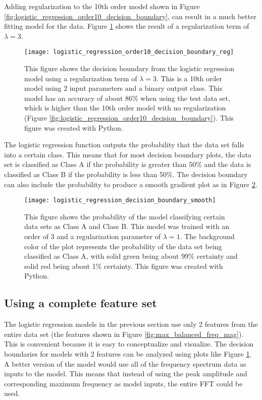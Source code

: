 Adding regularization to the 10th order model shown in Figure \ref{fig:logistic_regression_order10_decision_boundary}, can result in a much better fitting model for the data.  Figure \ref{fig:logistic_regression_order10_decision_boundary_reg} shows the result of a regularization term of $\lambda=3$.

\begin{figure}
	\centering
	\texttt{[image: logistic\_regression\_order10\_decision\_boundary\_reg]}
	\decoRule
	\caption{This figure shows the decision boundary from the logistic regression model using a regularization term of $\lambda=3$.  This is a 10th order model using 2 input parameters and a binary output class.  This model has an accuracy of about 86\% when using the test data set, which is higher than the 10th order model with no regularization (Figure \ref{fig:logistic_regression_order10_decision_boundary}).  This figure was created with Python.}
	\label{fig:logistic_regression_order10_decision_boundary_reg}
\end{figure}

The logistic regression function outputs the probability that the data set falls into a certain class.  This means that for most decision boundary plots, the data set is classified as Class A if the probability is greater than 50\% and the data is classified as Class B if the probability is less than 50\%.  The decision boundary can also include the probability to produce a smooth gradient plot as in Figure \ref{fig:logistic_regression_decision_boundary_smooth}.

\begin{figure}
	\centering
	\texttt{[image: logistic\_regression\_decision\_boundary\_smooth]}
	\decoRule
	\caption{This figure shows the probability of the model classifying certain data sets as Class A and Class B.  This model was trained with an order of 3 and a regularization parameter of $\lambda=1$.  The background color of the plot represents the probability of the data set being classified as Class A, with solid green being about 99\% certainty and solid red being about 1\% certainty.  This figure was created with Python.}
	\label{fig:logistic_regression_decision_boundary_smooth}
\end{figure}



\subsection{Using a complete feature set}
The logistic regression models in the previous section use only 2 features from the entire data set (the features shown in Figure \ref{fig:max_balanced_freq_mag}).  This is convenient because it is easy to conceptualize and visualize.  The decision boundaries for models with 2 features can be analyzed using plots like Figure \ref{fig:logistic_regression_order10_decision_boundary_reg}.  A better version of the model would use all of the frequency spectrum data as inputs to the model.  This means that instead of using the peak amplitude and corresponding maximum frequency as model inputs, the entire FFT could be used.

